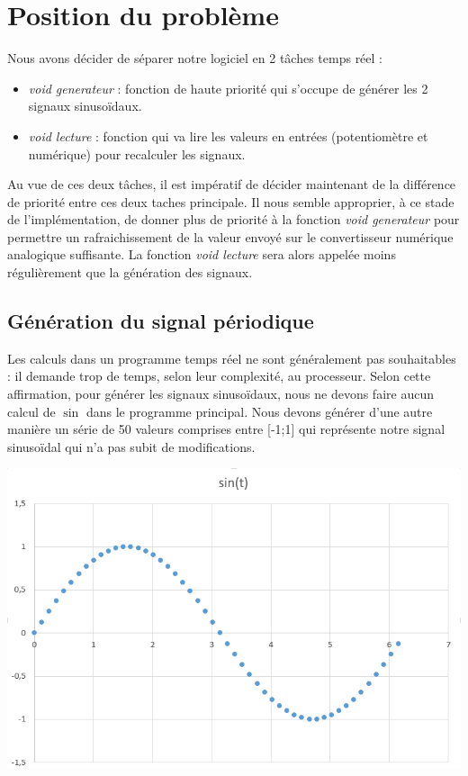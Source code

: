 \section{Position du problème}
Nous avons décider de séparer notre logiciel en 2 tâches temps réel : \begin{itemize}
\item \emph{void generateur} : fonction de haute priorité qui s'occupe de générer les 2 signaux sinusoïdaux. 
\item \emph{void lecture} : fonction qui va lire les valeurs en entrées (potentiomètre et numérique) pour recalculer les signaux.
\end{itemize}
Au vue de ces deux tâches, il est impératif de décider maintenant de la différence de priorité entre ces deux taches principale. Il nous semble approprier, à ce stade de l'implémentation, de donner plus de priorité à la fonction \emph{void generateur} pour permettre un rafraichissement de la valeur envoyé sur le convertisseur numérique analogique suffisante. La fonction \emph{void lecture} sera alors appelée moins régulièrement que la génération des signaux.
\subsection{Génération du signal périodique}
\label{subsection:signalperiodique}
Les calculs dans un programme temps réel ne sont généralement pas souhaitables : il demande trop de temps, selon leur complexité, au processeur. Selon cette affirmation, pour générer les signaux sinusoïdaux, nous ne devons faire aucun calcul de $\sin$ dans le programme principal. Nous devons générer d'une autre manière un série de 50 valeurs comprises entre [-1;1] qui représente notre signal sinusoïdal qui n'a pas subit de modifications.

\begin{center}
\includegraphics[width = .7\textwidth]{./II/images/sinus.png}
\end{center}
